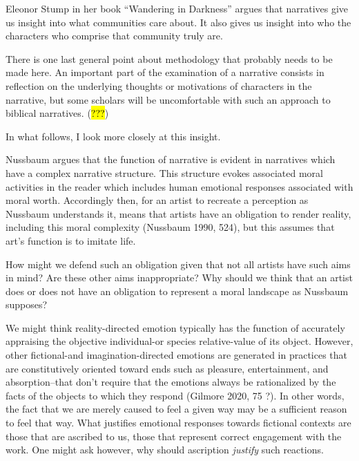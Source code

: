 \documentclass[
  letterpaper,
  DIV=11,
  numbers=noendperiod]{scrartcl}
\theoremstyle{remark}
\begin{document}
Eleonor Stump in her book ``Wandering in Darkness'' argues that
narratives give us insight into what communities care about. It also
gives us insight into who the characters who comprise that community
truly are.

There is one last general point about methodology that probably needs to
be made here. An important part of the examination of a narrative
consists in reflection on the underlying thoughts or motivations of
characters in the narrative, but some scholars will be uncomfortable
with such an approach to biblical narratives. (\hl{???})

In what follows, I look more closely at this insight.

Nussbaum argues that the function of narrative is evident in narratives
which have a complex narrative structure. This structure evokes
associated moral activities in the reader which includes human emotional
responses associated with moral worth. Accordingly then, for an artist
to recreate a perception as Nussbaum understands it, means that artists
have an obligation to render reality, including this moral complexity
(Nussbaum 1990, 524), but this assumes that art's function is to imitate
life.

How might we defend such an obligation given that not all artists have
such aims in mind? Are these other aims inappropriate? Why should we
think that an artist does or does not have an obligation to represent a
moral landscape as Nussbaum supposes?

We might think reality-directed emotion typically has the function of
accurately appraising the objective individual-or species relative-value
of its object. However, other fictional-and imagination-directed
emotions are generated in practices that are constitutively oriented
toward ends such as pleasure, entertainment, and absorption--that don't
require that the emotions always be rationalized by the facts of the
objects to which they respond (Gilmore 2020, 75 ?). In other words, the
fact that we are merely caused to feel a given way may be a sufficient
reason to feel that way. What justifies emotional responses towards
fictional contexts are those that are ascribed to us, those that
represent correct engagement with the work. One might ask however, why
should ascription \emph{justify} such reactions.
\end{document}

